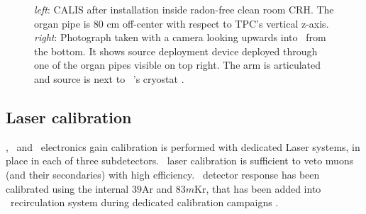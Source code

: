 \begin{figure}[htbp]
 \centering
{}
\caption{\textit{left}: CALIS after installation inside radon-free clean room CRH. The organ pipe is 80 cm off-center with respect to TPC's vertical z-axis. \textit{right}: Photograph taken with a camera looking upwards into \lsv\ from the bottom. It shows source deployment device deployed through one of the organ pipes visible on top right. The arm is articulated and source is next to \lar\ \tpc's cryostat \cite{Agnes:2015qyz}.
\label{fig:CALIS_photos}}
\end{figure}

\subsection*{Laser calibration}
\wcv, \lsv\ and \tpc\ electronics gain calibration is performed with dedicated Laser systems, in place in each of three subdetectors. \wcv\ laser calibration is sufficient to veto muons (and their secondaries) with high efficiency. \tpc\ detector response has been calibrated using the internal ${39}$Ar and $83m$Kr, that has been added into \lar\ recirculation system during dedicated calibration campaigns \cite{Agnes:2015gu}.







